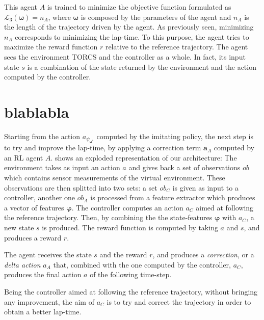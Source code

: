 This agent $A$ is trained to minimize the objective function formulated as $\mathcal{L}_3(\boldsymbol \omega) = n_A$, where $\boldsymbol \omega$ is composed by the parameters of the agent and $n_A$ is the length of the trajectory driven by the agent. As previously seen, minimizing $n_A$ corresponds to minimizing the lap-time.
To this purpose, the agent tries to maximize the reward function $r$ relative to the reference trajectory.
The agent sees the environment TORCS and the controller as a whole. In fact, its input state $s$ is a combination of the state returned by the environment and the action computed by the controller.


\section{blablabla}
Starting from the action $a_{\psi_{\boldsymbol \omega^*}}$ computed by the imitating policy, the next step is to try and improve the lap-time, by applying a correction term $\boldsymbol a_A$ computed by an RL agent $A$. 
 shows an exploded representation of our architecture:
The environment takes as input an action $a$ and gives back a set of observations $ob$ which contains sensor measurements of the virtual environment. These observations are then splitted into two sets: a set $ob_C$ is given as input to a controller, another one $ob_A$ is processed from a feature extractor which produces a vector of features $\boldsymbol \varphi$.
The controller computes an action $a_C$ aimed at following the reference trajectory.
Then, by combining the the state-features $\boldsymbol \varphi$ with $a_C$, a new state $s$ is produced.
The reward function is computed by taking $a$ and $s$, and produces a reward $r$.


The agent receives the state $s$ and the reward $r$, and produces a \textit{correction}, or a \textit{delta action} $a_A$ that, combined with the one computed by the controller, $a_C$, produces the final action $a$ of the following time-step. 


Being the controller aimed at following the reference trajectory, without bringing any improvement, the aim of $a_C$ is to try and correct the trajectory in order to obtain a better lap-time.






